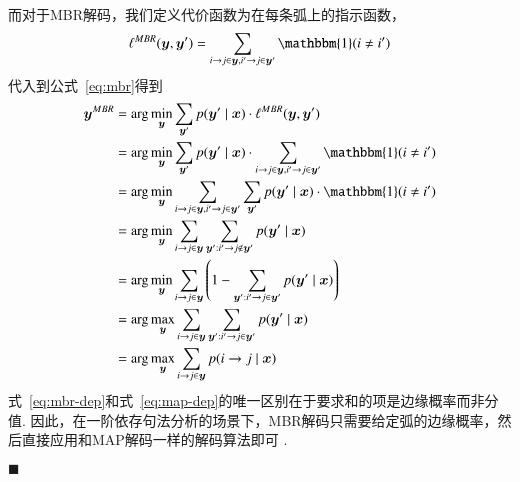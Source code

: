 而对于MBR解码，我们定义代价函数为在每条弧上的指示函数，
\begin{equation}
  \ell^{MBR}(\boldsymbol{y},\boldsymbol{y}^{\prime}) = \sum_{i\rightarrow j\in\boldsymbol{y},i^{\prime}\rightarrow j\in\boldsymbol{y}^{\prime}}\mathbbm{1}(i\neq i^{\prime})
\end{equation}
代入到公式~\ref{eq:mbr}得到
\begin{equation}
  \label{eq:mbr-dep}
  \begin{split}
    \boldsymbol{y}^{MBR}&= \arg\min_{\boldsymbol{y}}\sum_{\boldsymbol{y}^{\prime}}p(\boldsymbol{y}^{\prime}\mid\boldsymbol{x})\cdot\ell^{MBR}(\boldsymbol{y},\boldsymbol{y}^{\prime})\\
    &=\arg\min_{\boldsymbol{y}}\sum_{\boldsymbol{y}^{\prime}}p(\boldsymbol{y}^{\prime}\mid\boldsymbol{x})\cdot\sum_{i\rightarrow j\in\boldsymbol{y},i^{\prime}\rightarrow j\in\boldsymbol{y}^{\prime}}\mathbbm{1}(i\neq i^{\prime})\\
    &=\arg\min_{\boldsymbol{y}}\sum_{i\rightarrow j\in\boldsymbol{y},i^{\prime}\rightarrow j\in\boldsymbol{y}^{\prime}}\sum_{\boldsymbol{y}^{\prime}}p(\boldsymbol{y}^{\prime}\mid\boldsymbol{x})\cdot\mathbbm{1}(i\neq i^{\prime})\\
    &=\arg\min_{\boldsymbol{y}}\sum_{i\rightarrow j\in\boldsymbol{y}}\sum_{\boldsymbol{y}^{\prime}:i^{\prime}\rightarrow j\notin \boldsymbol{y}^{\prime}}p(\boldsymbol{y}^{\prime}\mid\boldsymbol{x})\\
    &=\arg\min_{\boldsymbol{y}}\sum_{i\rightarrow j\in\boldsymbol{y}}\left(1-\sum_{\boldsymbol{y}^{\prime}:i^{\prime}\rightarrow j\in \boldsymbol{y}^{\prime}}p(\boldsymbol{y}^{\prime}\mid\boldsymbol{x})\right)\\
    &=\arg\max_{\boldsymbol{y}}\sum_{i\rightarrow j\in\boldsymbol{y}}\sum_{\boldsymbol{y}^{\prime}:i^{\prime}\rightarrow j\in \boldsymbol{y}^{\prime}}p(\boldsymbol{y}^{\prime}\mid\boldsymbol{x})\\
    &=\arg\max_{\boldsymbol{y}}\sum_{i\rightarrow j\in\boldsymbol{y}}p(i\rightarrow j\mid\boldsymbol{x})
  \end{split}
\end{equation}
式~\ref{eq:mbr-dep}和式~\ref{eq:map-dep}的唯一区别在于要求和的项是边缘概率而非分值.
因此，在一阶依存句法分析的场景下，MBR解码只需要给定弧的边缘概率，然后直接应用和MAP解码一样的解码算法即可 \citep{smith-smith-2007-probabilistic, smith-2011-linguistic}.

\noindent$\blacksquare$

